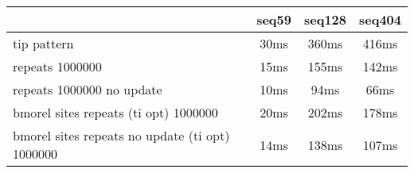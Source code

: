 \begin{tabular}{|l|c|c|c|}
\hline
 & seq59 & seq128 & seq404  \\
\hline
tip pattern &  30ms &  360ms &  416ms\\
\hline
repeats 1000000 &  15ms &  155ms &  142ms\\
\hline
repeats 1000000 no update &  10ms &  94ms &  66ms\\
\hline
bmorel sites repeats (ti opt) 1000000 &  20ms &  202ms &  178ms\\
\hline
bmorel sites repeats no update (ti opt) 1000000 &  14ms &  138ms &  107ms\\
\hline
\end{tabular}
